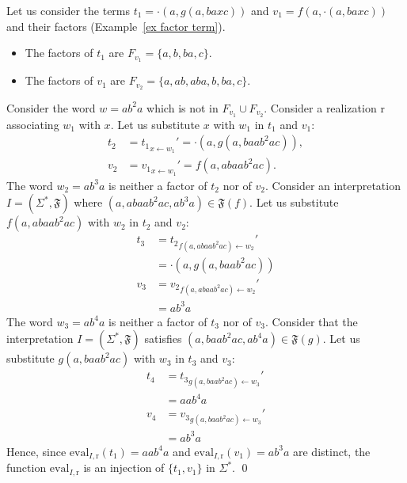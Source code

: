 \documentclass[a4paper]{llncs}
\begin{document}
  \begin{example}
    Let us consider the terms $t_1=\cdot(a,g(a,baxc))$ and $v_1=f(a,\cdot(a,baxc))$ and their factors (Example~\ref{ex factor term}).
      \begin{itemize}
         \item The factors of $t_1$ are $F_{v_1}=\{a,b,ba,c\}$.
         \item The factors of $v_1$ are $F_{v_2}=\{a,ab,aba,b,ba,c\}$. 
     \end{itemize}
     Consider the word $w=ab^2a$ which is not in $F_{v_1}\cup F_{v_2}$. Consider a realization $\mathrm{r}$ associating $w_1$ with $x$. Let us substitute $x$ with $w_1$ in $t_1$ and $v_1$:
        \begin{align*}
          t_2&={t_1}_{x\leftarrow w_1}'=\cdot(a,g(a,baab^2ac)),\\
           v_2&={v_1}_{x\leftarrow w_1}'=f(a,abaab^2ac).
        \end{align*}
        The word $w_2=ab^3a$ is neither a factor of $t_2$ nor of $v_2$. Consider an interpretation $I=(\Sigma^*,\mathfrak{F})$ where $(a,abaab^2ac,ab^3a)\in \mathfrak{F}(f)$. Let us substitute $f(a,abaab^2ac)$ with $w_2$ in $t_2$ and $v_2$:
        \begin{align*}
          t_3&={t_2}_{f(a,abaab^2ac) \leftarrow w_2}'\\
          &=\cdot(a,g(a,baab^2ac))\\
          v_3&={v_2}_{f(a,abaab^2ac)\leftarrow w_2}'\\
          &=ab^3a
        \end{align*}
        The word $w_3=ab^4a$ is neither a factor of $t_3$ nor of $v_3$. Consider that the interpretation $I=(\Sigma^*,\mathfrak{F})$ satisfies $(a,baab^2ac,ab^4a)\in \mathfrak{F}(g)$. Let us substitute $g(a,baab^2ac)$ with $w_3$ in $t_3$ and $v_3$:
        \begin{align*}
          t_4&={t_3}_{g(a,baab^2ac) \leftarrow w_3}'\\
          &=aab^4a\\
          v_4&={v_3}_{g(a,baab^2ac)\leftarrow w_3}'\\
          &=ab^3a
        \end{align*}
        Hence, since $\mathrm{eval}_{I,\mathrm{r}}(t_1)=aab^4a$ and $\mathrm{eval}_{I,\mathrm{r}}(v_1)=ab^3a$ are distinct, the function $\mathrm{eval}_{I,\mathrm{r}}$ is an injection of  $\{t_1,v_1\}$ in $\Sigma^*$.     
    \qed
  \end{example}
  
\end{document}

